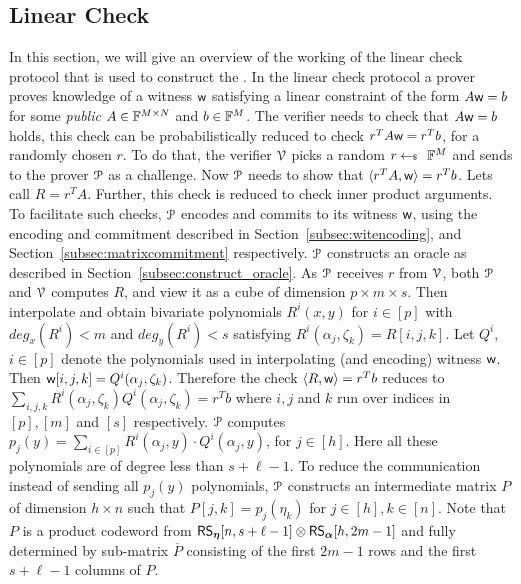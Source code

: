 \subsection{Linear Check}\label{subsec:lincheck}
In this section, we will give an overview of the working of the linear check protocol that is used to construct the \name. In the linear check protocol a prover proves knowledge of a witness $\wit$ satisfying a linear constraint of the form $A \wit = b$ for some \textit{public} $A \in \FF^{M \times N}$ and $b \in \FF^M$. 
The verifier needs to check that $A \wit = b$ holds, this check can be probabilistically reduced to check $r^T A \wit = r^T b$, for a randomly chosen $r$. To do that, the verifier $\verifier$ picks a random $r\sample \FF^M$ and sends to the prover $\prover$ as a challenge. Now $\prover$ needs to show that $\innp{r^T A}{\wit} = r^T b$. Lets call $R = r^T A$.
Further, this check is reduced to check inner product arguments. To facilitate such checks, $\prover$ encodes and commits to its witness $\wit$, using the encoding and commitment described in Section~\ref{subsec:witencoding}, and Section~\ref{subsec:matrixcommitment} respectively. $\prover$ constructs an oracle as described in Section~\ref{subsec:construct_oracle}.
As $\prover$ receives $r$ from $\verifier$, both $\prover$ and $\verifier$ computes $R$, and view it as a cube of dimension $p \times m \times s$. Then interpolate and obtain bivariate polynomials $R^i(x,y)$ for $i \in [p]$ with $deg_x(R^i) < m$ and $deg_y(R^i) < s$ satisfying $R^i(\alpha_j, \zeta_k) = R[i,j,k]$. Let $Q^i$, $i \in [p]$ denote the polynomials used in interpolating (and encoding) witness $\wit$. Then $\wit[i,j,k] = Q^i (\alpha_j, \zeta_k)$. Therefore the check $\innp{R}{\wit} = r^T b$ reduces to $\sum_{i,j,k}R^i(\alpha_j,\zeta_k)Q^i(\alpha_j,\zeta_k)=r^Tb$ where $i,j$ and $k$ run over indices in $[p],[m]$ and $[s]$ respectively. $\prover$ computes $p_j(y) = \sum_{i \in [p]} R^i(\alpha_j, y) \cdot Q^i(\alpha_j, y)$, for $j \in [h]$. Here all these polynomials are of degree less than $s+\ell-1$. To reduce the communication instead of sending all $p_j(y)$ polynomials, $\prover$ constructs an intermediate matrix $P$ of dimension $h \times n$ such that $P[j,k] = p_j(\eta_k)$ for $j\in[h], k\in[n]$. Note that $P$ is a product codeword from $\rsc{\eta}{n,s+\ell-1} \otimes \rsc{\alpha}{h,2m-1}$ and fully determined by sub-matrix $\overline{P}$ consisting of the first $2m-1$ rows and the first $s+\ell-1$ columns of $P$.

\smallskip  

